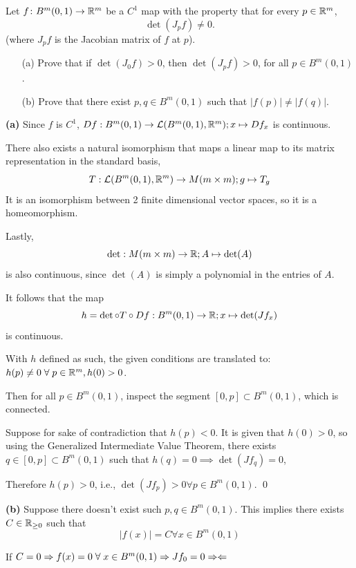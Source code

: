 \documentclass[a4paper, 12pt]{article}
\begin{document}
\begin{problem} 
Let $f\colon B^m(0,1)\to \mathbb{R}^m$ be a $C^1$ map with the property that for every $p\in \mathbb{R}^m$,
\[\det(J_p f)\neq 0.
\]
(where $J_p f$ is the Jacobian matrix of $f$ at $p$).
\begin{enumerate}
    \item[(a)] Prove that if $\det(J_0f) > 0$, then  $\det(J_p f)> 0$, for all $p\in  B^m(0,1)$.
    \item[(b)] Prove that there exist $p,q\in  B^m(0,1)$ such that $|f(p)|\neq |f(q)|$.
\end{enumerate}
\end{problem}
\begin{solution}
    \textbf{(a)} Since $f$ is $C^1$, $Df: B^m(0, 1) \to \mathcal{L}(B^m(0, 1), \mathbb{R}^m); x \mapsto Df_x$ is continuous.

    There also exists a natural isomorphism that maps a linear map to its matrix representation in the standard basis, \[
        T: \mathcal{L}(B^m(0, 1), \mathbb{R}^m) \to M(m \times m); g \mapsto T_g
    \]
    It is an isomorphism between 2 finite dimensional vector spaces, so it is a homeomorphism.

    Lastly, \[
        \det: M(m \times m) \to \mathbb{R}; A \mapsto \det(A)
    \]
    is also continuous, since $\det (A)$ is simply a polynomial in the entries of $A$.

    It follows that the map \[
        h = \det \circ T \circ Df: B^m(0, 1) \to \mathbb{R}; x \mapsto \det(Jf_x)
    \]
    is continuous.

    With $h$ defined as such, the given conditions are translated to: $h(p) \neq 0 \forall p \in \bbr^m, h(0) > 0$.

    Then for all $p \in B^m(0, 1)$, inspect the segment $[0, p] \subset B^m(0, 1)$, which is connected.

    Suppose for sake of contradiction that $h(p) < 0$. It is given that $h(0) > 0$, so using the Generalized Intermediate Value Theorem, there exists $q \in [0, p] \subset B^m(0, 1)$ such that $h(q) = 0 \implies \det(Jf_q) = 0$, \contra

    Therefore $h(p) > 0$, i.e., $ \det(Jf_p) > 0 \forall p \in B^m(0, 1)$. \qed

    \textbf{(b)} Suppose there doesn't exist such $p, q \in B^m(0, 1)$. This implies there exists $C \in \mathbb{R}_{\geq 0}$ such that \[
        |f(x)| = C \forall x \in B^m(0, 1)
    \]

    If $C = 0 \implies f(x) = 0 \forall x \in B^m(0, 1) \implies Jf_0 = 0 \contra$


\end{solution}
\end{document}
